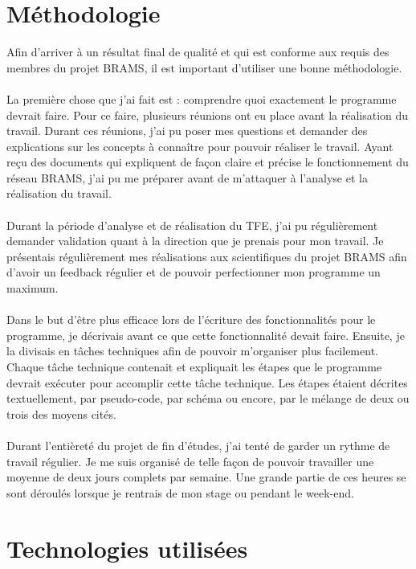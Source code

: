 \documentclass[11pt]{article}
\begin{document}
\section{Méthodologie}

Afin d'arriver à un résultat final de qualité et qui est conforme aux requis des membres du projet BRAMS, il est important d'utiliser une bonne méthodologie.\\
\\
La première chose que j'ai fait est : comprendre quoi exactement le programme devrait faire.
Pour ce faire, plusieurs réunions ont eu place avant la réalisation du travail.
Durant ces réunions, j'ai pu poser mes questions et demander des explications sur les concepts à connaître pour pouvoir réaliser le travail.
Ayant reçu des documents qui expliquent de façon claire et précise le fonctionnement du réseau BRAMS, j'ai pu me préparer avant de m'attaquer à l'analyse et la réalisation du travail.\\
\\
Durant la période d'analyse et de réalisation du TFE, j'ai pu régulièrement demander validation quant à la direction que je prenais pour mon travail.
Je présentais régulièrement mes réalisations aux scientifiques du projet BRAMS afin d'avoir un feedback régulier et de pouvoir perfectionner mon programme un maximum.\\
\\
Dans le but d'être plus efficace lors de l'écriture des fonctionnalités pour le programme, je décrivais avant ce que cette fonctionnalité devait faire.
Ensuite, je la divisais en tâches techniques afin de pouvoir m'organiser plus facilement.
Chaque tâche technique contenait et expliquait les étapes que le programme devrait exécuter pour accomplir cette tâche technique.
Les étapes étaient décrites textuellement, par pseudo-code, par schéma ou encore, par le mélange de deux ou trois des moyens cités.\\
\\
Durant l'entièreté du projet de fin d'études, j'ai tenté de garder un rythme de travail régulier.
Je me suis organisé de telle façon de pouvoir travailler une moyenne de deux jours complets par semaine.
Une grande partie de ces heures se sont déroulés lorsque je rentrais de mon stage ou pendant le week-end.\\

\newpage

\section{Technologies utilisées}
\end{document}
